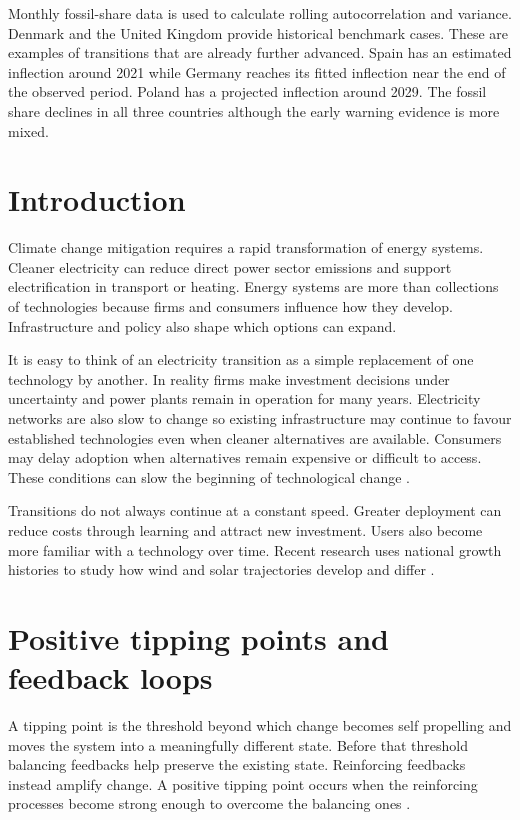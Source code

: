 \documentclass[
]{krantz}
\begin{document}
Monthly fossil-share data is used to calculate rolling autocorrelation and variance. Denmark and the United Kingdom provide historical benchmark cases. These are examples of transitions that are already further advanced. Spain has an estimated inflection around 2021 while Germany reaches its fitted inflection near the end of the observed period. Poland has a projected inflection around 2029. The fossil share declines in all three countries although the early warning evidence is more mixed.

\section*{Introduction}\label{introduction-9}


Climate change mitigation requires a rapid transformation of energy systems. Cleaner electricity can reduce direct power sector emissions and support electrification in transport or heating. Energy systems are more than collections of technologies because firms and consumers influence how they develop. Infrastructure and policy also shape which options can expand.

It is easy to think of an electricity transition as a simple replacement of one technology by another. In reality firms make investment decisions under uncertainty and power plants remain in operation for many years. Electricity networks are also slow to change so existing infrastructure may continue to favour established technologies even when cleaner alternatives are available. Consumers may delay adoption when alternatives remain expensive or difficult to access. These conditions can slow the beginning of technological change \citep{lenton2023, geels2023}.

Transitions do not always continue at a constant speed. Greater deployment can reduce costs through learning and attract new investment. Users also become more familiar with a technology over time. Recent research uses national growth histories to study how wind and solar trajectories develop and differ \citep{jakhmola2026}.

\section*{Positive tipping points and feedback loops}\label{positive-tipping-points-and-feedback-loops}


A tipping point is the threshold beyond which change becomes self propelling and moves the system into a meaningfully different state. Before that threshold balancing feedbacks help preserve the existing state. Reinforcing feedbacks instead amplify change. A positive tipping point occurs when the reinforcing processes become strong enough to overcome the balancing ones \citep{lenton2026}.
\end{document}
